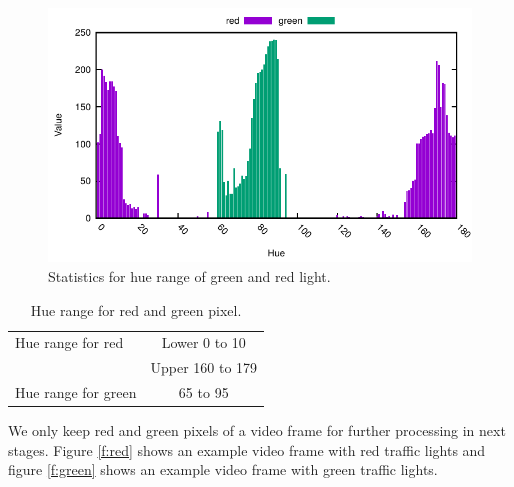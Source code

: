 \begin{figure}[!ht]
\centering
\includegraphics[width=5.2in]{plots/stat_light.pdf}
\caption{Statistics for hue range of green and red light.}
\label{f:light_hue}
\end{figure}


\begin{table}[h!]
  \centering
  \caption{Hue range for red and green pixel.}
  \label{t:hue_range}
  \begin{tabular}{  l | c  }
    \hline
    Hue range for red & Lower 0 to 10 \\ \cline{2-2}
    & Upper 160 to 179 \\
    \hline \hline
    Hue range for green & 65 to 95 \\
    \hline
  \end{tabular}
\end{table}


We only keep red and green pixels of a video frame for further processing in next stages.
Figure \ref{f:red} shows an example video frame with red traffic lights and figure \ref{f:green} shows an example video frame with green traffic lights.

